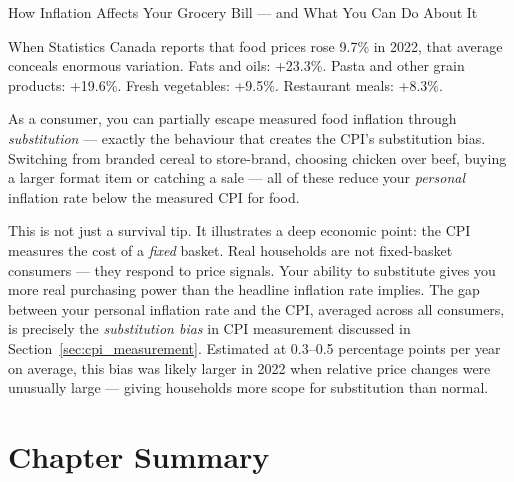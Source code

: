 \begin{everydaylife}{How Inflation Affects Your Grocery Bill --- and What You Can Do About It}

When Statistics Canada reports that food prices rose 9.7\% in 2022,
that average conceals enormous variation. Fats and oils: +23.3\%.
Pasta and other grain products: +19.6\%. Fresh vegetables: +9.5\%.
Restaurant meals: +8.3\%.

As a consumer, you can partially escape measured food inflation through
\textit{substitution} --- exactly the behaviour that creates the CPI's
substitution bias. Switching from branded cereal to store-brand, choosing
chicken over beef, buying a larger format item or catching a sale --- all
of these reduce your \textit{personal} inflation rate below the measured
CPI for food.

This is not just a survival tip. It illustrates a deep economic point:
the CPI measures the cost of a \textit{fixed} basket. Real households
are not fixed-basket consumers --- they respond to price signals. Your
ability to substitute gives you more real purchasing power than the
headline inflation rate implies. The gap between your personal inflation
rate and the CPI, averaged across all consumers, is precisely the
\textit{substitution bias} in CPI measurement discussed in
Section~\ref{sec:cpi_measurement}. Estimated at 0.3--0.5 percentage
points per year on average, this bias was likely larger in 2022 when
relative price changes were unusually large --- giving households more
scope for substitution than normal.
\end{everydaylife}

\section*{Chapter Summary}


